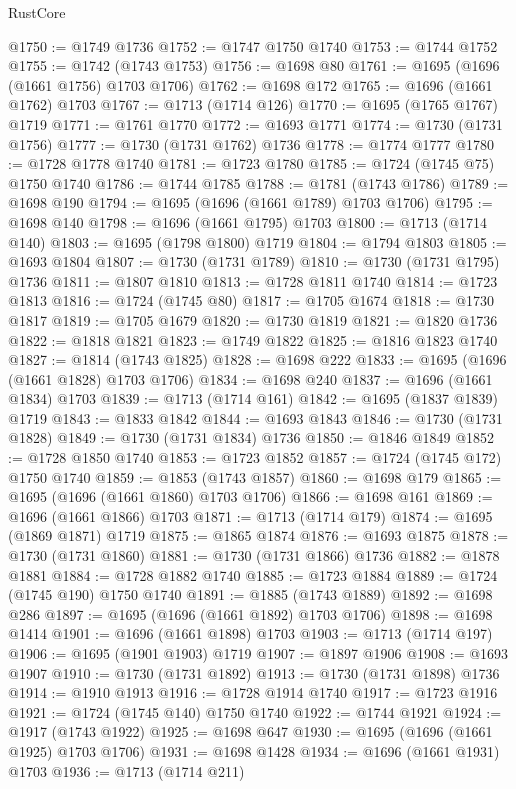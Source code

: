 \begin{lexlean}{RustCore}
\begin{coremodule}
@1750 := @1749 @1736
@1752 := @1747 @1750 @1740
@1753 := @1744 @1752
@1755 := @1742 (@1743 @1753)
@1756 := @1698 @80
@1761 := @1695 (@1696 (@1661 @1756) @1703 @1706)
@1762 := @1698 @172
@1765 := @1696 (@1661 @1762) @1703
@1767 := @1713 (@1714 @126)
@1770 := @1695 (@1765 @1767) @1719
@1771 := @1761 @1770
@1772 := @1693 @1771
@1774 := @1730 (@1731 @1756)
@1777 := @1730 (@1731 @1762) @1736
@1778 := @1774 @1777
@1780 := @1728 @1778 @1740
@1781 := @1723 @1780
@1785 := @1724 (@1745 @75) @1750 @1740
@1786 := @1744 @1785
@1788 := @1781 (@1743 @1786)
@1789 := @1698 @190
@1794 := @1695 (@1696 (@1661 @1789) @1703 @1706)
@1795 := @1698 @140
@1798 := @1696 (@1661 @1795) @1703
@1800 := @1713 (@1714 @140)
@1803 := @1695 (@1798 @1800) @1719
@1804 := @1794 @1803
@1805 := @1693 @1804
@1807 := @1730 (@1731 @1789)
@1810 := @1730 (@1731 @1795) @1736
@1811 := @1807 @1810
@1813 := @1728 @1811 @1740
@1814 := @1723 @1813
@1816 := @1724 (@1745 @80)
@1817 := @1705 @1674
@1818 := @1730 @1817
@1819 := @1705 @1679
@1820 := @1730 @1819
@1821 := @1820 @1736
@1822 := @1818 @1821
@1823 := @1749 @1822
@1825 := @1816 @1823 @1740
@1827 := @1814 (@1743 @1825)
@1828 := @1698 @222
@1833 := @1695 (@1696 (@1661 @1828) @1703 @1706)
@1834 := @1698 @240
@1837 := @1696 (@1661 @1834) @1703
@1839 := @1713 (@1714 @161)
@1842 := @1695 (@1837 @1839) @1719
@1843 := @1833 @1842
@1844 := @1693 @1843
@1846 := @1730 (@1731 @1828)
@1849 := @1730 (@1731 @1834) @1736
@1850 := @1846 @1849
@1852 := @1728 @1850 @1740
@1853 := @1723 @1852
@1857 := @1724 (@1745 @172) @1750 @1740
@1859 := @1853 (@1743 @1857)
@1860 := @1698 @179
@1865 := @1695 (@1696 (@1661 @1860) @1703 @1706)
@1866 := @1698 @161
@1869 := @1696 (@1661 @1866) @1703
@1871 := @1713 (@1714 @179)
@1874 := @1695 (@1869 @1871) @1719
@1875 := @1865 @1874
@1876 := @1693 @1875
@1878 := @1730 (@1731 @1860)
@1881 := @1730 (@1731 @1866) @1736
@1882 := @1878 @1881
@1884 := @1728 @1882 @1740
@1885 := @1723 @1884
@1889 := @1724 (@1745 @190) @1750 @1740
@1891 := @1885 (@1743 @1889)
@1892 := @1698 @286
@1897 := @1695 (@1696 (@1661 @1892) @1703 @1706)
@1898 := @1698 @1414
@1901 := @1696 (@1661 @1898) @1703
@1903 := @1713 (@1714 @197)
@1906 := @1695 (@1901 @1903) @1719
@1907 := @1897 @1906
@1908 := @1693 @1907
@1910 := @1730 (@1731 @1892)
@1913 := @1730 (@1731 @1898) @1736
@1914 := @1910 @1913
@1916 := @1728 @1914 @1740
@1917 := @1723 @1916
@1921 := @1724 (@1745 @140) @1750 @1740
@1922 := @1744 @1921
@1924 := @1917 (@1743 @1922)
@1925 := @1698 @647
@1930 := @1695 (@1696 (@1661 @1925) @1703 @1706)
@1931 := @1698 @1428
@1934 := @1696 (@1661 @1931) @1703
@1936 := @1713 (@1714 @211)

\end{coremodule}
\end{lexlean}
